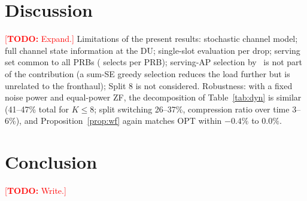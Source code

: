 \documentclass[10pt, final, journal, letterpaper, twocolumn]{IEEEtran}
\newcommand{\todo}[1]{\textcolor{red}{[\textbf{TODO:} #1]}}
\begin{document}
\section{Discussion}
\label{sec:discussion}

\todo{Expand.} Limitations of the present results: stochastic channel model; full channel state information at the DU; single-slot evaluation per drop; serving set common to all PRBs (\cite{girycki2024twc} selects per PRB); serving-AP selection by~\cite{girycki2024twc} is not part of the contribution (a sum-SE greedy selection reduces the load further but is unrelated to the fronthaul); Split 8 is not considered. Robustness: with a fixed noise power and equal-power ZF, the decomposition of Table~\ref{tab:dyn} is similar (41--47\% total for $K\le8$; split switching 26--37\%, compression ratio over time 3--6\%), and Proposition~\ref{prop:wf} again matches OPT within $-0.4\%$ to $0.0\%$.

\section{Conclusion}
\label{sec:conclusion}

\todo{Write.}

\printbibliography
\end{document}
